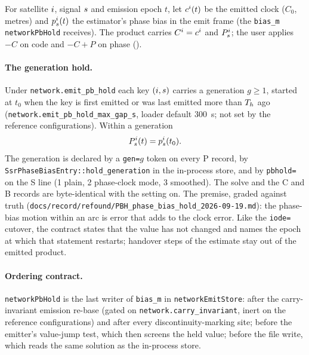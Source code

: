 \documentclass[main.tex]{subfiles}
\begin{document}
For satellite $i$, signal $s$ and emission epoch $t$, let
$c^i(t)$ be the emitted clock ($C_0$, metres) and $p^i_s(t)$
the estimator's phase bias in the emit frame (the \texttt{bias\_m}
\texttt{networkPbHold} receives). The product carries $C^i = c^i$ and
$P^i_s$; the user applies $-C$ on code and $-C + P$ on phase
().

\paragraph{The generation hold.}
Under \texttt{network.emit\_pb\_hold} each key $(i,s)$
carries a generation $g \ge 1$, started at $t_0$ when the key is first
emitted or was last emitted more than $T_{h}$ ago
(\texttt{network.emit\_pb\_hold\_max\_gap\_s}, loader default
\SI{300}{s}; not set by the reference configurations). Within a generation
\begin{equation}
P^i_s(t) = p^i_s(t_0).
\label{eq:wire-hold-plain}
\end{equation}
The generation is declared by a \texttt{gen=}$g$ token on every P record,
by \texttt{SsrPhaseBiasEntry::hold\_generation} in the in-process store,
and by \texttt{pbhold=} on the S line (1 plain, 2 phase-clock mode, 3
smoothed). The solve and the C and B records are byte-identical with the
setting on. The premise, graded against truth
(\texttt{docs/record/refound/PBH\_phase\_bias\_hold\_2026-09-19.md}): the phase-bias
motion within an arc is error that adds to the clock error. Like the
\texttt{iode=} cutover, the contract states that the value has not
changed and names the epoch at which that statement restarts; handover
steps of the estimate stay out of the emitted product.

\paragraph{Ordering contract.}
\texttt{networkPbHold} is the last writer of \texttt{bias\_m} in
\texttt{networkEmitStore}: after the carry-invariant emission re-base
(gated on \texttt{network.carry\_invariant}, inert on the reference
configurations) and after every discontinuity-marking site; before the
emitter's value-jump test, which then screens the held value; before the
file write, which reads the same solution as the in-process store.
\end{document}
